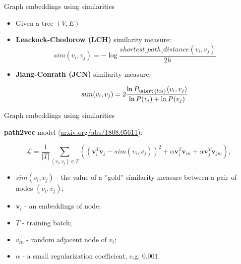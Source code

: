 \begin{frame}{Graph embeddings using similarities}



\begin{itemize}
\item Given a tree $(V, E)$

\item \alert{\textbf{Leackock-Chodorow (LCH)}} similarity measure:
$$
sim(v_i, v_j)= −\log\frac{shortest\_path\_distance(v_i, v_j) }{2h} 
$$

\pause 
\item \alert{\textbf{Jiang-Conrath (JCN)}} similarity measure:

$$
sim(v_i, v_j) = 2 \frac{\ln P_{\alert{lcs}}(v_i, v_j)}{\ln P(v_i) + \ln P(v_j)} 
$$
\end{itemize}
	
\end{frame}



\begin{frame}{Graph embeddings using similarities}

\textbf{path2vec} model (\url{arxiv.org/abs/1808.05611}): 

$$
\mathcal{L} = \frac{1}{|T|}  \sum_{ (v_i, v_j) \in T } \left( (\mathbf{v}_i^T \mathbf{v}_j - sim(v_i, v_j) )^2  + \alpha \mathbf{v}_i^T \mathbf{v}_{in} + \alpha \mathbf{v}_j^T \mathbf{v}_{jm} \right) ,
$$


\begin{itemize}
	\item $sim(v_i, v_j)$ - the value of a ''gold'' similarity measure between a pair of nodes $(v_i, v_j)$;
	\item $\mathbf{v}_i$ - an embeddings of node;
	\item $T$ - training batch; 
	\item $v_{in}$ - random adjacent node of $v_i$;
	\item $\alpha$ - a small regularization coefficient, e.g. $0.001$.
\end{itemize}



%
%
%

\end{frame}

